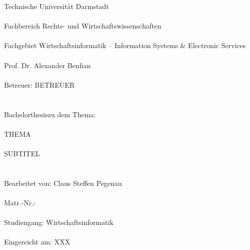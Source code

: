 %
%
%
%

\singlespacing 
\noindent Technische Universität Darmstadt \\\\
Fachbereich Rechts- und Wirtschaftswissenschaften \\\\
Fachgebiet Wirtschaftsinformatik -- Information Systems \& Electronic Services \\\\
Prof. Dr. Alexander Benlian \\\\
Betreuer: BETREUER \\\\
\\
\lbrack Bachelorthesis\rbrack zu dem Thema: \\\\
\lbrack THEMA\rbrack \\\\
\lbrack SUBTITEL\rbrack \\\\
\\
Bearbeitet von: \lbrack Claus Steffen Pegenau\rbrack \\\\
Matr.-Nr.: \rbrack \\\\
Studiengang: \lbrack Wirtschaftsinformatik \rbrack \\\\
Eingereicht am: \lbrack XXX\rbrack \\\\

\onehalfspacing

\setcounter{page}{2}